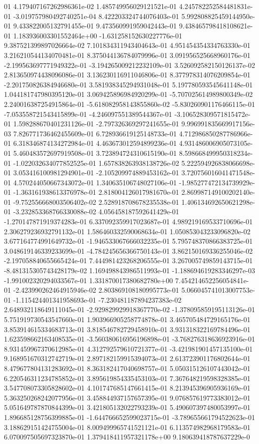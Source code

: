 01	4.179407167262986361e-02	1.485749956029121521e-01	4.245782252584481831e-01	-3.019757980492740251e-04	8.422203324744076403e-01	5.992808825459144950e-01	9.433822005132791455e-01	9.473560991959042443e-01	9.438465798418108621e-01	1.183936003301552464e+00	-1.631258152630227776e-01	9.387521399897026664e-02	7.101834311943404643e-01	4.951454354334763330e-01	3.216210544134070481e-01	8.375044136784079996e-01	3.091956525668960176e-01	-2.199563697771949322e-01	-3.194265009212232109e-01	3.526092582150126137e-02	2.813650974438096086e-01	3.136230116911046806e-01	8.377978314076209854e-01	-2.201750826384946680e-01	3.581938345294931048e-01	5.197780593545641148e-01	1.044181747980395120e-01	3.069425896984920299e-01	-5.707025614989800349e-02	2.240016387254915864e-01	-5.618082958143855860e-02	-5.830260901176466115e-01	-7.053558721543415899e-01	-4.246097551389544367e-01	-3.106528309571815472e-01	1.598288670401231126e-01	-2.797326369297241655e-01	9.996991835669917156e-03	7.826771736462455609e-01	6.728936619125148733e-01	4.712986850287786966e-01	6.318346874134272984e-01	4.463673012594899236e-01	4.931486006905073105e-01	5.460483572697919508e-01	3.723894724310615190e-01	8.598668499950318234e-01	-1.022032634077852525e-01	1.657838263938138726e-02	5.222594926838066698e-01	3.053416100981294901e-01	-2.105209974889453162e-01	3.720756016041471548e-01	4.570244050667343072e-01	1.340635106748027106e-01	-1.985277472134739929e-01	-1.363161938613376978e-01	2.818004126017981670e-01	2.869987149100202140e-01	-9.752556668003506402e-02	2.528918708678235538e-01	1.406134692650621298e-01	-3.232853368766330088e-02	4.056458187592641429e-01	-1.270147871919374283e-01	6.337092359917023687e-01	4.989219169533710696e-01	2.306279236932791132e-01	1.586460332590068634e-01	1.050853043233096820e-02	3.677164774991649732e-01	-1.946533067666032235e-01	5.795748370866383725e-01	3.048619146339233699e-01	-4.784245656366750143e-01	3.862150169336255046e-02	-2.197058840655665424e-01	7.444981423268206555e-01	3.267005749859143715e-01	-8.481315305743428179e-02	1.169498843986511993e-01	-1.188694619283346297e-03	-1.991002320294033567e-01	1.331870017380682780e+00	7.454214652256054841e-01	-2.423990262464915946e-02	2.803869108180995773e-01	5.066045741013007753e-01	-1.115424401341958693e-01	-7.230481187894237383e-02	2.648932118649111045e-01	-2.929829929918367770e-02	-1.378095859195113126e-01	5.751919730543547660e-01	1.903966905258774878e-01	3.465705484729165176e-01	3.853914615334683713e-01	3.818546782729458910e-01	3.931318322169784496e-01	1.623598662163408535e-01	-3.560380616956196898e-01	-3.768276318636923916e-01	8.931459967370612985e-01	4.312792579610721377e-01	-3.421981901457135100e-01	9.168951670312742719e-01	2.897182159915394073e-01	2.613723901176802644e-01	8.479677804131283692e-01	8.363182417040698757e-01	5.050315126107443042e-01	6.220546311234785852e-01	3.895619854335453103e-01	7.367648219598328385e-01	3.547708073305828602e-01	4.101747685147661415e-01	8.213945396905936169e-01	5.363250268242077956e-01	3.458844937157657395e-01	9.076857619773383012e-01	5.051649787870844399e-01	3.421805132022793239e-01	5.490607397480053997e-01	1.896685128756399885e-01	-1.644766652599023715e-01	-3.789655661794522623e-01	3.188629151424755004e-01	8.009499965741521121e-01	6.113574982968179583e-01	6.070097505697323870e-01	1.379418411957321178e+00	9.180639418787637229e-0